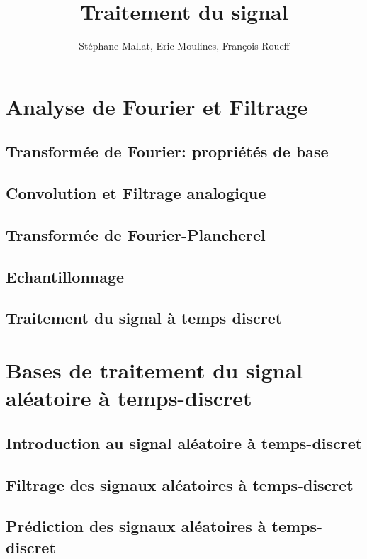 \documentclass[graybox,envcountchap,envcountsame,sectrefs]{svmono}
\title{Traitement du signal}
\author{St\'ephane Mallat, Eric Moulines, François Roueff}
\begin{document}
\maketitle
\tableofcontents
\part{Analyse de Fourier et Filtrage}
\chapter{Transformée de Fourier: propriétés de base}


\chapter{Convolution et Filtrage analogique}

\chapter{Transformée de Fourier-Plancherel}

\chapter{Echantillonnage}

\chapter{Traitement du signal \`a temps discret}
\label{discret-chap}


\part{Bases de traitement du signal al\'eatoire \`a temps-discret}
\chapter{Introduction au signal al\'eatoire \`a temps-discret}


\chapter{Filtrage des signaux al\'eatoires \`a temps-discret}

\chapter{Pr\'ediction des signaux al\'eatoires à temps-discret}
\label{chap:Prediction}

\end{document}

